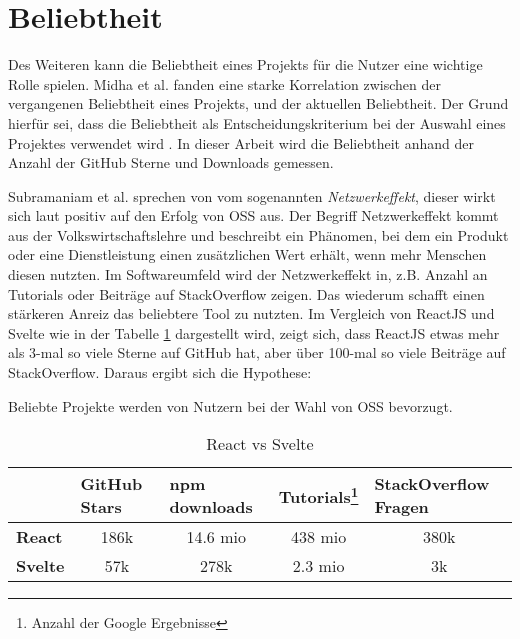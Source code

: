\section{Beliebtheit}\label{sec:beliebtheit_erfolgsfaktor}

Des Weiteren kann die Beliebtheit eines Projekts für die Nutzer eine wichtige Rolle spielen. 
Midha et al. fanden eine starke Korrelation zwischen der vergangenen Beliebtheit 
eines Projekts, und der aktuellen Beliebtheit. Der Grund hierfür sei, dass die Beliebtheit
als Entscheidungskriterium bei der Auswahl eines Projektes verwendet wird
\cite{midhaFactorsAffectingSuccess2012}. %
In dieser Arbeit wird die Beliebtheit anhand der Anzahl der GitHub Sterne und Downloads gemessen.

Subramaniam et al. sprechen von vom sogenannten \textit{Netzwerkeffekt},
dieser wirkt sich laut \cite{subramaniamDeterminantsOpenSource2009} %
positiv auf den Erfolg von OSS aus.
Der Begriff Netzwerkeffekt kommt aus der Volkswirtschaftslehre und beschreibt ein Phänomen,
bei dem ein Produkt oder eine Dienstleistung einen zusätzlichen Wert erhält, wenn mehr Menschen
diesen nutzten.
Im Softwareumfeld wird der Netzwerkeffekt in, z.B. Anzahl an Tutorials
oder Beiträge auf StackOverflow zeigen.
Das wiederum schafft einen stärkeren Anreiz das beliebtere Tool zu nutzten.
Im Vergleich von ReactJS und Svelte wie in der Tabelle \ref{tab:react_vs_svelte} dargestellt wird, 
zeigt sich, dass ReactJS etwas mehr als 3-mal so viele Sterne auf GitHub hat, aber über 100-mal so viele 
Beiträge auf StackOverflow. 
Daraus ergibt sich die Hypothese:


\begin{hypothesis}
    Beliebte Projekte werden von Nutzern bei der Wahl von OSS bevorzugt.
    \label{H:8} %
\end{hypothesis}


\begin{table}[h]
    \begin{tabular}{lcccc}
        \hline
                        & \multicolumn{1}{l}{\textbf{GitHub Stars}} & \multicolumn{1}{l}{\textbf{npm downloads}} & \multicolumn{1}{l}{\textbf{Tutorials}\footnote{Anzahl der Google Ergebnisse}} & \multicolumn{1}{l}{\textbf{StackOverflow Fragen}} \\ \hline
        \textbf{React}  & 186k                                      & 14.6 mio                                   & 438 mio                                                                       & 380k                                              \\
        \textbf{Svelte} & 57k                                       & 278k                                       & 2.3 mio                                                                       & 3k
    \end{tabular}%
    \caption{React vs Svelte}
    \label{tab:react_vs_svelte}
\end{table}